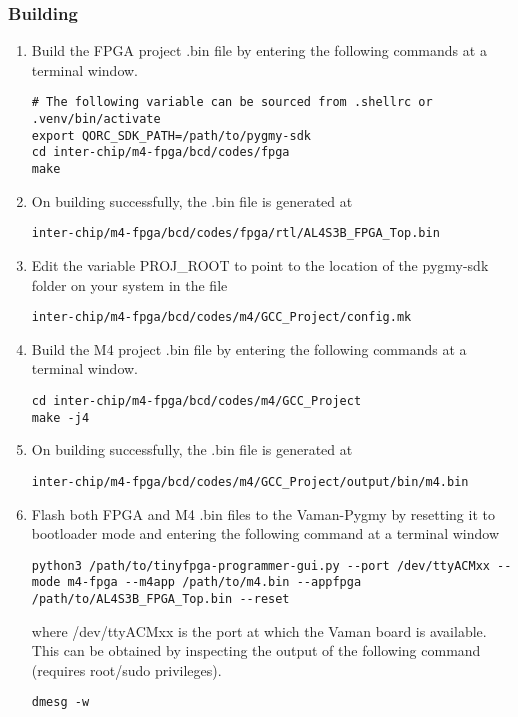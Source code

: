 \subsubsection{Building}
\begin{enumerate}
    \item Build the FPGA project .bin file by entering the following commands at
    a terminal window.
    \begin{lstlisting}
# The following variable can be sourced from .shellrc or .venv/bin/activate
export QORC_SDK_PATH=/path/to/pygmy-sdk
cd inter-chip/m4-fpga/bcd/codes/fpga
make
    \end{lstlisting}
    \item On building successfully, the .bin file is generated at
    \begin{lstlisting}
inter-chip/m4-fpga/bcd/codes/fpga/rtl/AL4S3B_FPGA_Top.bin
    \end{lstlisting}
    \item Edit the variable PROJ\_ROOT to point to the location of the pygmy-sdk
    folder on your system in the file
    \begin{lstlisting}
inter-chip/m4-fpga/bcd/codes/m4/GCC_Project/config.mk
    \end{lstlisting}
    \item Build the M4 project .bin file by entering the following commands at a
    terminal window.
    \begin{lstlisting}
cd inter-chip/m4-fpga/bcd/codes/m4/GCC_Project
make -j4
    \end{lstlisting}
    \item On building successfully, the .bin file is generated at
    \begin{lstlisting}
inter-chip/m4-fpga/bcd/codes/m4/GCC_Project/output/bin/m4.bin
    \end{lstlisting}
    \item Flash both FPGA and M4 .bin files to the Vaman-Pygmy by resetting it
    to bootloader mode and entering the following command at a terminal window
    \begin{lstlisting}
python3 /path/to/tinyfpga-programmer-gui.py --port /dev/ttyACMxx --mode m4-fpga --m4app /path/to/m4.bin --appfpga /path/to/AL4S3B_FPGA_Top.bin --reset
    \end{lstlisting}
    where /dev/ttyACMxx is the port at which the Vaman board is available. This
    can be obtained by inspecting the output of the following command (requires
    root/sudo privileges).
    \begin{lstlisting}
dmesg -w
    \end{lstlisting}
\end{enumerate}

